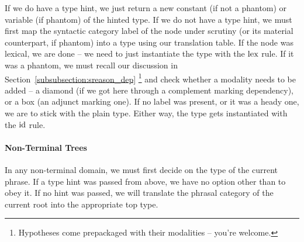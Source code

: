 If we do have a type hint, we just return a new constant (if not a phantom) or variable (if phantom) of the hinted type.
If we do not have a type hint, we must first map the syntactic category label of the node under scrutiny (or its material counterpart, if phantom) into a type using our translation table.
If the node was lexical, we are done -- we need to just instantiate the type with the $\mathrm{lex}$ rule.
If it was a phantom, we must recall our discussion in Section~\ref{subsubsection:sreason_dep}%
	\footnote{Hypotheses come prepackaged with their modalities -- you're welcome.}
and check whether a modality needs to be added -- a diamond (if we got here through a complement marking dependency), or a box (an adjunct marking one).
If no label was present, or it was a heady one, we are to stick with the plain type.
Either way, the type gets instantiated with the $\mathrm{id}$ rule.

\paragraph{Non-Terminal Trees}
In any non-terminal domain, we must first decide on the type of the current phrase.
If a type hint was passed from above, we have no option other than to obey it.
If no hint was passed, we will translate the phrasal category of the current root into the appropriate top type.

